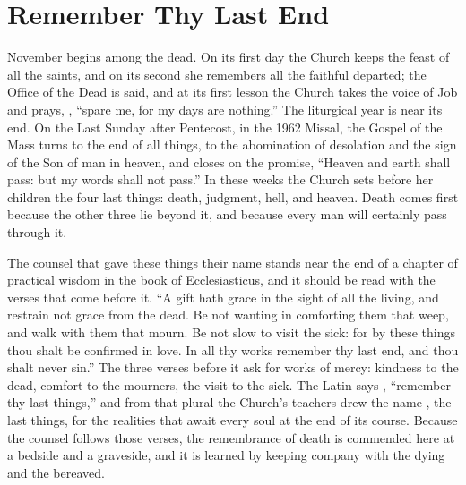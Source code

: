 \section{Remember Thy Last End}

November begins among the dead. On its first day the Church keeps the feast of all the saints, and on its second she remembers all the faithful departed; the Office of the Dead is said, and at its first lesson the Church takes the voice of Job and prays, , ``spare me, for my days are nothing.'' The liturgical year is near its end. On the Last Sunday after Pentecost, in the 1962 Missal, the Gospel of the Mass turns to the end of all things, to the abomination of desolation and the sign of the Son of man in heaven, and closes on the promise, ``Heaven and earth shall pass: but my words shall not pass.'' In these weeks the Church sets before her children the four last things: death, judgment, hell, and heaven. Death comes first because the other three lie beyond it, and because every man will certainly pass through it.

The counsel that gave these things their name stands near the end of a chapter of practical wisdom in the book of Ecclesiasticus, and it should be read with the verses that come before it. ``A gift hath grace in the sight of all the living, and restrain not grace from the dead. Be not wanting in comforting them that weep, and walk with them that mourn. Be not slow to visit the sick: for by these things thou shalt be confirmed in love. In all thy works remember thy last end, and thou shalt never sin.'' The three verses before it ask for works of mercy: kindness to the dead, comfort to the mourners, the visit to the sick. The Latin says , ``remember thy last things,'' and from that plural the Church's teachers drew the name , the last things, for the realities that await every soul at the end of its course. Because the counsel follows those verses, the remembrance of death is commended here at a bedside and a graveside, and it is learned by keeping company with the dying and the bereaved.

